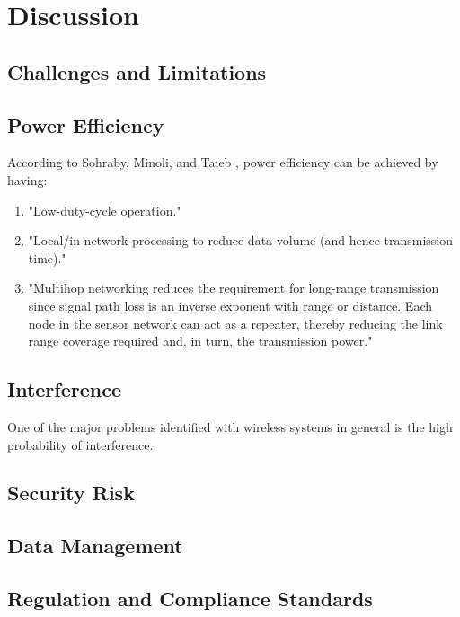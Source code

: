 \chapter{Discussion}

\section{Challenges and Limitations}

\section{Power Efficiency}

According to Sohraby, Minoli, and Taieb \cite{sohraby2007wireless}, power efficiency can be achieved by having: 

\begin{enumerate}
	\item "Low-duty-cycle operation."
	\item "Local/in-network processing to reduce data volume (and hence transmission time)."
	\item "Multihop networking reduces the requirement for long-range transmission since signal path loss is an inverse exponent with range or distance. Each node in the sensor network can act as a repeater, thereby reducing the link range coverage required and, in turn, the transmission power." 
\end{enumerate}

\section{Interference}

One of the major problems identified with wireless systems in general is the high probability of interference. 

\section{Security Risk}

\section{Data Management}

\section{Regulation and Compliance Standards}

